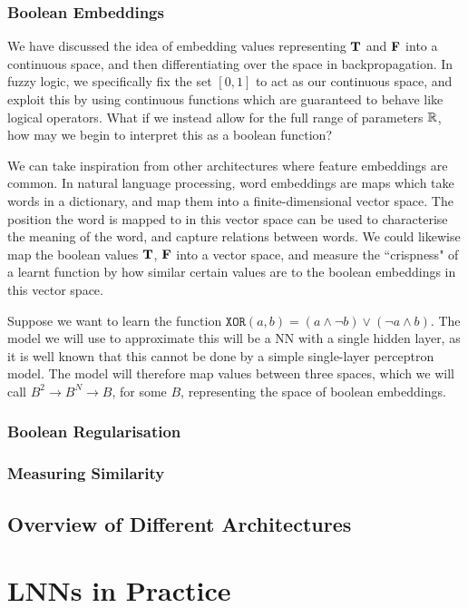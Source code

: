 \documentclass[conference]{report}
\begin{document}
\subsection{Boolean Embeddings}

We have discussed the idea of embedding values representing $\textbf{T}$ and $\textbf{F}$ into a continuous space, and then differentiating over the space in backpropagation. In fuzzy logic, we specifically fix the set $[0,1]$ to act as our continuous space, and exploit this by using continuous functions which are guaranteed to behave like logical operators. What if we instead allow for the full range of parameters $\mathbb{R}$, how may we begin to interpret this as a boolean function?

We can take inspiration from other architectures where feature embeddings are common. In natural language processing, word embeddings are maps which take words in a dictionary, and map them into a finite-dimensional vector space. The position the word is mapped to in this vector space can be used to characterise the meaning of the word, and capture relations between words. We could likewise map the boolean values $\textbf{T}$, $\textbf{F}$ into a vector space, and measure the ``crispness" of a learnt function by how similar certain values are to the boolean embeddings in this vector space.

Suppose we want to learn the function $\texttt{XOR}(a, b) = (a \land \lnot b) \lor (\lnot a \land b)$. The model we will use to approximate this will be a NN with a single hidden layer, as it is well known that this cannot be done by a simple single-layer perceptron model. The model will therefore map values between three spaces, which we will call $B^2 \to B^N \to B$, for some $B$, representing the space of boolean embeddings.

\subsection{Boolean Regularisation}

\subsection{Measuring Similarity}
 
\section{Overview of Different Architectures}
 
\chapter{LNNs in Practice} 
\end{document}
